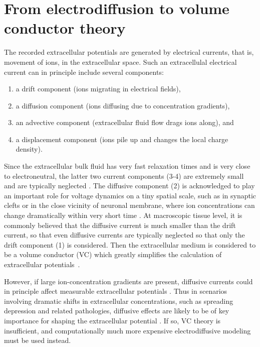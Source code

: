 \documentclass[preprint,11pt,authoryear]{elsarticle}
\begin{document}
\section{%
From electrodiffusion to volume conductor theory}
\label{sec:theory}

The recorded extracellular potentials are generated by electrical currents, that is, movement of ions, in the extracellular space.
Such an extracellulal electrical current can in principle include several components:
%
\begin{enumerate}
\item a drift component (ions migrating in electrical fields), 
\item a diffusion component (ions diffusing due to concentration gradients),
\item an advective component (extracellular fluid flow drags ions along), and
\item a displacement component (ions pile up and changes the local charge density). 
\end{enumerate}
%
Since the extracellular bulk fluid has very fast relaxation times and is very close to electroneutral, the latter two current components (3-4) are extremely small and are typically neglected \citep{Grodzinsky2011, Gratiy2017}. The diffusive component (2) is acknowledged to play an important role for voltage dynamics on a tiny spatial scale, such as in synaptic clefts or in the close vicinity of neuronal membrane, where ion concentrations can change dramatically within very short time \citep{Savtchenko2017, Pods2017}. At macroscopic tissue level, it is commonly believed that the diffusive current is much smaller than the drift current, so that even diffusive currents are typically neglected so that only the drift component (1) is considered. Then the extracellular medium is considered to be a volume conductor (VC) which greatly simplifies the calculation of extracellular potentials~\citep{Holt1999, Linden2014}.

However, if large ion-concentration gradients are present, diffusive currents could in principle affect measurable extracellular potentials \citep{Halnes2016, Halnes2017, Solbra2018}. Thus in scenarios involving dramatic shifts in extracellular concentrations, such as spreading depression and related pathologies, diffusive effects are likely to be of key importance for shaping the extracellular potential \citep{Almeida2004, OConnell2016}. If so, VC theory is insufficient, and computationally much more expensive electrodiffusive modeling must be used instead.
\end{document}
